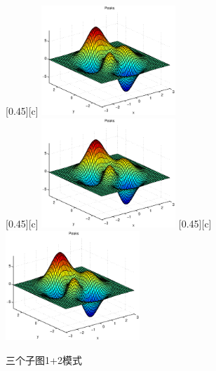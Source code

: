 \documentclass{article}
\begin{document}
    \begin{figure}[!htbp]
        \centering
        [0.45\textwidth][c]{
            \centering
            \includegraphics[width=0.45\textwidth]{example}
            \label{}
        }\\%
        [0.45\textwidth][c]{
            \centering
            \includegraphics[width=0.45\textwidth]{example}
            \label{}
        }%
        \hspace{0.3cm}
        [0.45\textwidth][c]{
            \centering
            \includegraphics[width=0.45\textwidth]{example}
            \label{}
        }%
        \caption{三个子图1+2模式}
        \label{}
    \end{figure}
\end{document}

